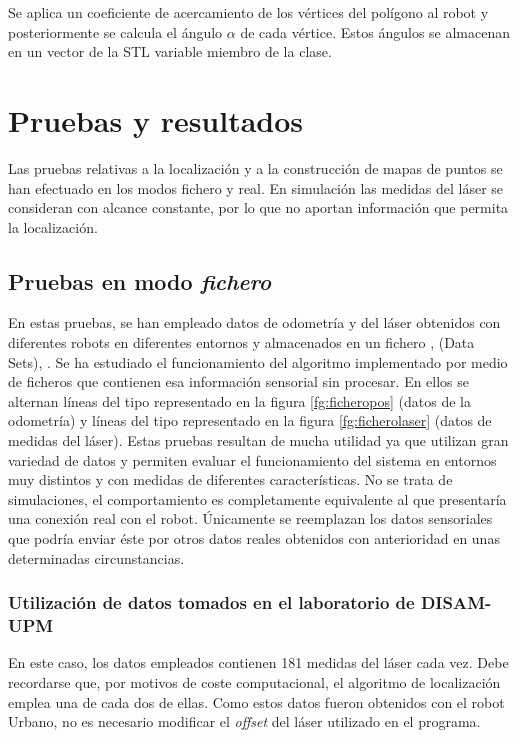 Se aplica un coeficiente de acercamiento de los vértices del polígono al robot y posteriormente se calcula el ángulo $\alpha$ de cada vértice. Estos ángulos se almacenan en un vector  de la STL variable miembro de la clase.

\section{Pruebas y resultados}
Las pruebas relativas a la localización y a la construcción de mapas de puntos se han efectuado en los modos fichero y real. En simulación las medidas del láser se consideran con alcance constante, por lo que no aportan información que permita la localización.

\subsection{Pruebas en modo \emph{fichero}}
En estas pruebas, se han empleado datos de odometría y del láser obtenidos con diferentes robots en diferentes entornos y almacenados en un fichero \cite{Rodriguez-Losada04},\cite{CARMEN} (Data Sets), \cite{Radish}. Se ha estudiado el funcionamiento del algoritmo implementado por medio de ficheros que contienen esa información sensorial sin procesar. En ellos se alternan líneas del tipo representado en la figura \ref{fg:ficheropos} (datos de la odometría) y líneas del tipo representado en la figura \ref{fg:ficherolaser} (datos de medidas del láser). Estas pruebas resultan de mucha utilidad ya que utilizan gran variedad de datos y permiten evaluar el funcionamiento del sistema en entornos muy distintos y con medidas de diferentes características. No se trata de simulaciones, el comportamiento es completamente equivalente al que presentaría una conexión real con el robot. Únicamente se reemplazan los datos sensoriales que podría enviar éste por otros datos reales obtenidos con anterioridad en unas determinadas circunstancias.

\subsubsection{Utilización de datos tomados en el laboratorio de DISAM-UPM}
En este caso, los datos empleados contienen 181 medidas del láser cada vez. Debe recordarse que, por motivos de coste computacional, el algoritmo de localización emplea una de cada dos de ellas. Como estos datos fueron obtenidos con el robot Urbano, no es necesario modificar el \emph{offset} del láser utilizado en el programa.

